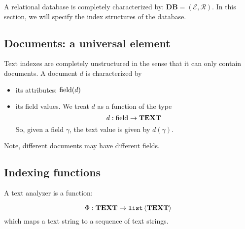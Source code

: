 \documentclass{article}
\begin{document}
A relational database is completely characterized by:
$\mathbf{DB} = (\mathcal{E}, \mathcal{R})$.  In this section, we will specify
the index structures of the database.

\subsection{Documents: a universal element}

Text indexes are completely unstructured in the sense that it can only contain
documents.  A document $d$ is characterized by
\begin{itemize}
\item its attributes: $\operatorname{field}(d)$
\item its field values.  We treat $d$ as a function of the type
$$d:\operatorname{field}\to\mathbf{TEXT}$$
So, given a field $\gamma$, the text value is given by $d(\gamma)$.
\end{itemize}

Note, different documents may have different fields.

\subsection{Indexing functions}

A text analyzer is a function:

$$\Phi:\mathbf{TEXT} \to \mathtt{list}\left<\mathbf{TEXT}\right>$$
which maps a text string to a sequence of text strings.
\end{document}

